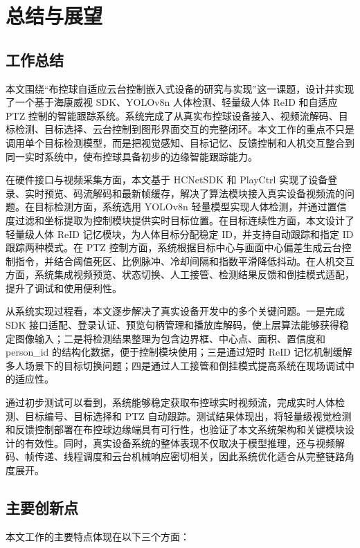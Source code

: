 \chapter{总结与展望}

\section{工作总结}

本文围绕“布控球自适应云台控制嵌入式设备的研究与实现”这一课题，设计并实现了一个基于海康威视 SDK、YOLOv8n 人体检测、轻量级人体 ReID 和自适应 PTZ 控制的智能跟踪系统。系统完成了从真实布控球设备接入、视频流解码、目标检测、目标选择、云台控制到图形界面交互的完整闭环。本文工作的重点不只是调用单个目标检测模型，而是把视觉感知、目标记忆、反馈控制和人机交互整合到同一实时系统中，使布控球具备初步的边缘智能跟踪能力。

在硬件接口与视频采集方面，本文基于 HCNetSDK 和 PlayCtrl 实现了设备登录、实时预览、码流解码和最新帧缓存，解决了算法模块接入真实设备视频流的问题。在目标检测方面，系统选用 YOLOv8n 轻量模型实现人体检测，并通过置信度过滤和坐标提取为控制模块提供实时目标位置。在目标连续性方面，本文设计了轻量级人体 ReID 记忆模块，为人体目标分配稳定 ID，并支持自动跟踪和指定 ID 跟踪两种模式。在 PTZ 控制方面，系统根据目标中心与画面中心偏差生成云台控制指令，并结合阈值死区、比例脉冲、冷却间隔和指数平滑降低抖动。在人机交互方面，系统集成视频预览、状态切换、人工接管、检测结果反馈和倒挂模式适配，提升了调试和使用便利性。

从系统实现过程看，本文逐步解决了真实设备开发中的多个关键问题。一是完成 SDK 接口适配、登录认证、预览句柄管理和播放库解码，使上层算法能够获得稳定图像输入；二是将检测结果整理为包含边界框、中心点、面积、置信度和 person\_id 的结构化数据，便于控制模块使用；三是通过短时 ReID 记忆机制缓解多人场景下的目标切换问题；四是通过人工接管和倒挂模式提高系统在现场调试中的适应性。

通过初步测试可以看到，系统能够稳定获取布控球实时视频流，完成实时人体检测、目标编号、目标选择和 PTZ 自动跟踪。测试结果体现出，将轻量级视觉检测和反馈控制部署在布控球边缘端具有可行性，也验证了本文系统架构和关键模块设计的有效性。同时，真实设备系统的整体表现不仅取决于模型推理，还与视频解码、帧传递、线程调度和云台机械响应密切相关，因此系统优化适合从完整链路角度展开。

\section{主要创新点}

本文工作的主要特点体现在以下三个方面：

